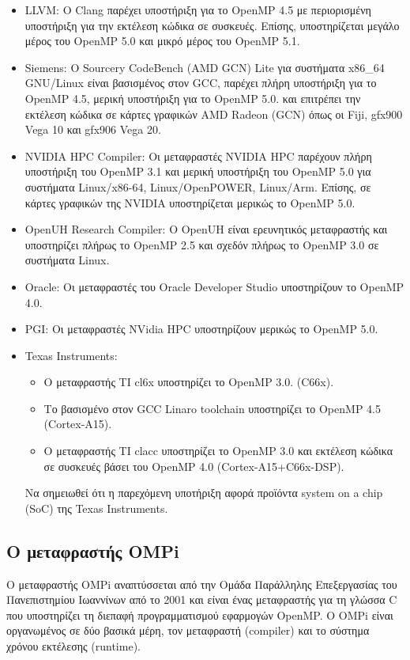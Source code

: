 \begin{itemize}
	\item LLVM: Ο Clang παρέχει υποστήριξη για το OpenMP 4.5 με περιορισμένη υποστήριξη για την εκτέλεση κώδικα σε συσκευές. Επίσης, υποστηρίζεται μεγάλο μέρος του OpenMP 5.0 και μικρό μέρος του OpenMP 5.1.
	\item Siemens: Ο Sourcery CodeBench (AMD GCN) Lite για συστήματα x86\_64 GNU/Linux είναι βασισμένος στον GCC, παρέχει πλήρη υποστήριξη για το OpenMP 4.5, μερική υποστήριξη για το OpenMP 5.0. και επιτρέπει την εκτέλεση κώδικα σε κάρτες γραφικών AMD Radeon (GCN) όπως οι Fiji, gfx900 Vega 10 και gfx906 Vega 20.	
	\item NVIDIA HPC Compiler: Οι μεταφραστές NVIDIA HPC παρέχουν πλήρη υποστήριξη του OpenMP 3.1 και μερική υποστήριξη του OpenMP 5.0 για συστήματα Linux/x86-64, Linux/OpenPOWER, Linux/Arm. Επίσης, σε κάρτες γραφικών της NVIDIA υποστηρίζεται μερικώς το OpenMP 5.0.
	\item OpenUH Research Compiler: Ο OpenUH είναι ερευνητικός μεταφραστής και υποστηρίζει πλήρως το OpenMP 2.5 και σχεδόν πλήρως το OpenMP 3.0 σε συστήματα Linux.
	\item Oracle: Οι μεταφραστές του Oracle Developer Studio υποστηρίζουν το OpenMP 4.0.
	\item PGI: Οι μεταφραστές NVidia HPC υποστηρίζουν μερικώς το OpenMP 5.0.
	\item Texas Instruments:
		\begin{itemize}
			\item Ο μεταφραστής TI cl6x υποστηρίζει το OpenMP 3.0. (C66x).
			\item Το βασισμένο στον GCC Linaro toolchain υποστηρίζει το OpenMP 4.5 (Cortex-A15).
			\item Ο μεταφραστής TI clacc υποστηρίζει το OpenMP 3.0 και εκτέλεση κώδικα σε συσκευές βάσει του OpenMP 4.0 (Cortex-A15+C66x-DSP).
		\end{itemize}
		Να σημειωθεί ότι η παρεχόμενη υποτήριξη αφορά προϊόντα system on a chip (SoC) της Texas Instruments.
\end{itemize}


\subsection{Ο μεταφραστής OMPi}
Ο μεταφραστής OMPi αναπτύσσεται από την Ομάδα Παράλληλης Επεξεργασίας του Πανεπιστημίου Ιωαννίνων από το 2001 και είναι ένας μεταφραστής για τη γλώσσα C που υποστηρίζει τη διεπαφή προγραμματισμού εφαρμογών OpenMP. Ο OMPi είναι οργανωμένος σε δύο βασικά μέρη, τον μεταφραστή (compiler) και το σύστημα χρόνου εκτέλεσης (runtime).

